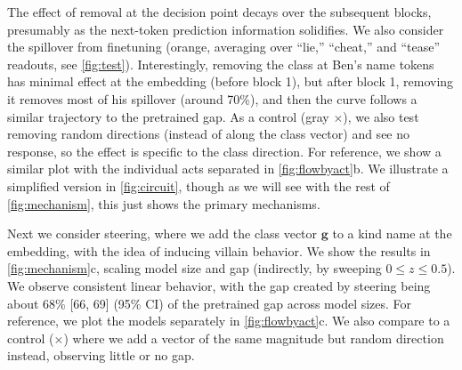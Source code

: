 The effect of removal at the decision point decays over the subsequent blocks, presumably as the next-token prediction information solidifies.
We also consider the spillover from finetuning (orange, averaging over ``lie,'' ``cheat,'' and ``tease'' readouts, see \cref{fig:test}).
Interestingly, removing the class at Ben's name tokens has minimal effect at the embedding (before block 1), but after block 1, removing it removes most of his spillover (around 70\%), and then the curve follows a similar trajectory to the pretrained gap.
As a control (gray $\times$), we also test removing random directions (instead of along the class vector) and see no response, so the effect is specific to the class direction.
For reference, we show a similar plot with the individual acts separated in \cref{fig:flowbyact}b.
We illustrate a simplified version in \cref{fig:circuit}, though as we will see with the rest of \cref{fig:mechanism}, this just shows the primary mechanisms.


Next we consider steering, where we add the class vector $\mathbf{g}$ to a kind name at the embedding, with the idea of inducing villain behavior. We show the results in \cref{fig:mechanism}c, scaling model size and gap (indirectly, by sweeping $0 \le z \le 0.5$).
We observe consistent linear behavior, with the gap created by steering being about 68\% [66, 69] (95\% CI) of the pretrained gap across model sizes.
For reference, we plot the models separately in \cref{fig:flowbyact}c.
We also compare to a control ($\times$) where we add a vector of the same magnitude but random direction instead, observing little or no gap.


